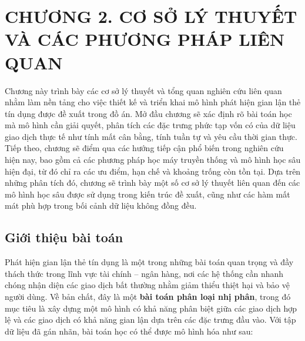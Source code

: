 \newpage
\section*{CHƯƠNG 2. CƠ SỞ LÝ THUYẾT VÀ CÁC PHƯƠNG PHÁP LIÊN QUAN}

Chương này trình bày các cơ sở lý thuyết và tổng quan nghiên cứu liên quan nhằm làm nền tảng cho việc thiết kế và triển khai mô hình phát hiện gian lận thẻ tín dụng được đề xuất trong đồ án. Mở đầu chương sẽ xác định rõ bài toán học mà mô hình cần giải quyết, phân tích các đặc trưng phức tạp vốn có của dữ liệu giao dịch thực tế như tính mất cân bằng, tính tuần tự và yêu cầu thời gian thực. Tiếp theo, chương sẽ điểm qua các hướng tiếp cận phổ biến trong nghiên cứu hiện nay, bao gồm cả các phương pháp học máy truyền thống và mô hình học sâu hiện đại, từ đó chỉ ra các ưu điểm, hạn chế và khoảng trống còn tồn tại. Dựa trên những phân tích đó, chương sẽ trình bày một số cơ sở lý thuyết liên quan đến các mô hình học sâu được sử dụng trong kiến trúc đề xuất, cũng như các hàm mất mát phù hợp trong bối cảnh dữ liệu không đồng đều.

\setcounter{section}{2}
\setcounter{subsection}{0}
\setcounter{figure}{0}
\setcounter{table}{0}

\subsection{Giới thiệu bài toán}

Phát hiện gian lận thẻ tín dụng là một trong những bài toán quan trọng và đầy thách thức trong lĩnh vực tài chính – ngân hàng, nơi các hệ thống cần nhanh chóng nhận diện các giao dịch bất thường nhằm giảm thiểu thiệt hại và bảo vệ người dùng. Về bản chất, đây là một \textbf{bài toán phân loại nhị phân}, trong đó mục tiêu là xây dựng một mô hình có khả năng phân biệt giữa các giao dịch hợp lệ và các giao dịch có khả năng gian lận dựa trên các đặc trưng đầu vào. Với tập dữ liệu đã gán nhãn, bài toán học có thể được mô hình hóa như sau:

